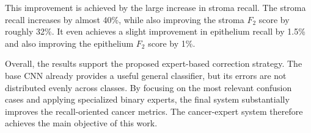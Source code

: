 This improvement is achieved by the large increase in stroma recall. The stroma
recall increases by almost 40\%, while also improving the stroma $F_2$ score by
roughly 32\%. It even achieves a slight improvement in epithelium recall by
1.5\% and also improving the epithelium $F_2$ score by 1\%.

Overall, the results support the proposed expert-based correction strategy. The
base CNN already provides a useful general classifier, but its errors are not
distributed evenly across classes. By focusing on the most relevant confusion
cases and applying specialized binary experts, the final system substantially
improves the recall-oriented cancer metrics. The cancer-expert system therefore
achieves the main objective of this work.
